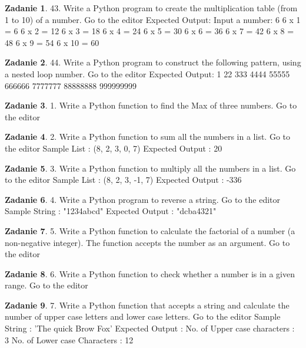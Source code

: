 \documentclass[11pt]{article}
\theoremstyle{definition}
\newtheorem{zadanie}{Zadanie}
\begin{document}
\begin{zadanie}
43. Write a Python program to create the multiplication table (from 1 to 10) of a number. Go to the editor
Expected Output:
Input a number: 6
6 x 1 = 6
6 x 2 = 12
6 x 3 = 18
6 x 4 = 24
6 x 5 = 30
6 x 6 = 36
6 x 7 = 42
6 x 8 = 48
6 x 9 = 54
6 x 10 = 60
\end{zadanie}

\begin{zadanie}
44. Write a Python program to construct the following pattern, using a nested loop number. Go to the editor
Expected Output:
1
22
333
4444
55555
666666
7777777
88888888
999999999
\end{zadanie}
\begin{zadanie}
1. Write a Python function to find the Max of three numbers. Go to the editor
\end{zadanie}

\begin{zadanie}
2. Write a Python function to sum all the numbers in a list. Go to the editor
Sample List : (8, 2, 3, 0, 7)
Expected Output : 20
\end{zadanie}

\begin{zadanie}
3. Write a Python function to multiply all the numbers in a list. Go to the editor
Sample List : (8, 2, 3, -1, 7)
Expected Output : -336
\end{zadanie}

\begin{zadanie}
4. Write a Python program to reverse a string. Go to the editor
Sample String : "1234abcd"
Expected Output : "dcba4321"
\end{zadanie}

\begin{zadanie}
5. Write a Python function to calculate the factorial of a number (a non-negative integer). The function accepts the number as an argument. Go to the editor
\end{zadanie}

\begin{zadanie}
6. Write a Python function to check whether a number is in a given range. Go to the editor
\end{zadanie}

\begin{zadanie}
7. Write a Python function that accepts a string and calculate the number of upper case letters and lower case letters. Go to the editor
Sample String : 'The quick Brow Fox'
Expected Output :
No. of Upper case characters : 3
No. of Lower case Characters : 12
\end{zadanie}
\end{document}

